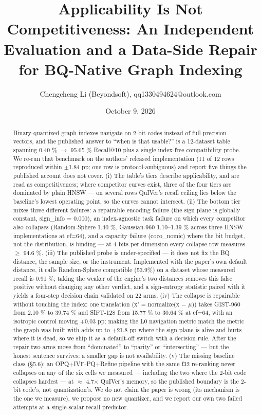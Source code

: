 \documentclass[
  10pt,
]{article}
\title{Applicability Is Not Competitiveness: An Independent Evaluation
and a Data-Side Repair for BQ-Native Graph Indexing}
\author{Chengcheng Li (Beyondsoft), qq1330494624@outlook.com}
\date{October 9, 2026}
\begin{document}
\maketitle
\begin{abstract}
Binary-quantized graph indexes navigate on 2-bit codes instead of
full-precision vectors, and the published answer to ``when is that
usable?'' is a 12-dataset table spanning 0.40 \% $\rightarrow$ 95.65 \% Recall@10
plus a single index-free compatibility probe. We re-run that benchmark
on the authors' released implementation (11 of 12 rows reproduced within
$\pm$1.84 pp; one row is protocol-ambiguous) and report five things the
published account does not cover. (i) The table's tiers describe
applicability, and are read as competitiveness; where competitor curves
exist, three of the four tiers are dominated by plain HNSW --- on
several rows QuIVer's recall ceiling lies below the baseline's lowest
operating point, so the curves cannot intersect. (ii) The bottom tier
mixes three different failures: a repairable encoding failure (the sign
plane is globally constant, sign\_info = 0.000), an index-agnostic task
failure on which every competitor also collapses (Random-Sphere 1.40 \%,
Gaussian-960 1.10--1.39 \% across three HNSW implementations at ef=64),
and a capacity failure (coco\_nomic) where the bit budget, not the
distribution, is binding --- at 4 bits per dimension every collapse row
measures $\geq$ 94.6 \%. (iii) The published probe is under-specified --- it
does not fix the BQ distance, the sample size, or the instrument.
Implemented with the paper's own default distance, it calls
Random-Sphere compatible (53.9\%) on a dataset whose measured recall is
0.91 \%; taking the weaker of the engine's two distances removes this
false positive without changing any other verdict, and a sign-entropy
statistic paired with it yields a four-step decision chain validated on
22 arms. (iv) The collapse is repairable without touching the index: one
translation (x' = normalize(x $-$ $\mu$)) takes GIST-960 from 2.10 \% to 39.74
\% and SIFT-128 from 15.77 \% to 30.64 \% at ef=64, with an isotropic
control moving +0.03 pp; making the L0 navigation metric match the
metric the graph was built with adds up to +21.8 pp where the sign plane
is alive and hurts where it is dead, so we ship it as a default-off
switch with a decision rule. After the repair two arms move from
``dominated'' to ``parity'' or ``intersecting'' --- but the honest
sentence survives: a smaller gap is not availability. (v) The missing
baseline class (§5.6): an OPQ+IVF-PQ+Refine pipeline with the same f32
re-ranking never collapses on any of the six cells we measured ---
including the two where the 2-bit code collapses hardest --- at $\approx$ 4.7$\times$
QuIVer's memory, so the published boundary is the 2-bit code's, not
quantization's. We do not claim the paper is wrong (its mechanism is the
one we measure), we propose no new quantizer, and we report our own two
failed attempts at a single-scalar recall predictor.
\end{abstract}
\end{document}
